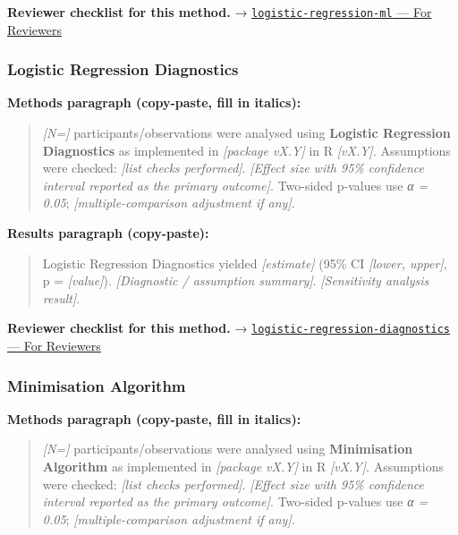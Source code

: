 \documentclass[
]{article}
\begin{document}
\textbf{Reviewer checklist for this method.} →
\href{../chapters/13-ml/logistic-regression-ml.Rmd\#for-reviewers}{\texttt{logistic-regression-ml}
--- For Reviewers}

\subsubsection{Logistic Regression
Diagnostics}\label{logistic-regression-diagnostics}

\textbf{Methods paragraph (copy-paste, fill in italics):}

\begin{quote}
\emph{{[}N={]}} participants/observations were analysed using
\textbf{Logistic Regression Diagnostics} as implemented in
\emph{{[}package vX.Y{]}} in R \emph{{[}vX.Y{]}}. Assumptions were
checked: \emph{{[}list checks performed{]}}. \emph{{[}Effect size with
95\% confidence interval reported as the primary outcome{]}}. Two-sided
p-values use \emph{α = 0.05}; \emph{{[}multiple-comparison adjustment if
any{]}}.
\end{quote}

\textbf{Results paragraph (copy-paste):}

\begin{quote}
Logistic Regression Diagnostics yielded \emph{{[}estimate{]}} (95\% CI
\emph{{[}lower, upper{]}}, p = \emph{{[}value{]}}). \emph{{[}Diagnostic
/ assumption summary{]}}. \emph{{[}Sensitivity analysis result{]}}.
\end{quote}

\textbf{Reviewer checklist for this method.} →
\href{../chapters/07-regression/logistic-regression-diagnostics.Rmd\#for-reviewers}{\texttt{logistic-regression-diagnostics}
--- For Reviewers}

\subsubsection{Minimisation Algorithm}\label{minimisation-algorithm}

\textbf{Methods paragraph (copy-paste, fill in italics):}

\begin{quote}
\emph{{[}N={]}} participants/observations were analysed using
\textbf{Minimisation Algorithm} as implemented in \emph{{[}package
vX.Y{]}} in R \emph{{[}vX.Y{]}}. Assumptions were checked: \emph{{[}list
checks performed{]}}. \emph{{[}Effect size with 95\% confidence interval
reported as the primary outcome{]}}. Two-sided p-values use \emph{α =
0.05}; \emph{{[}multiple-comparison adjustment if any{]}}.
\end{quote}
\end{document}
